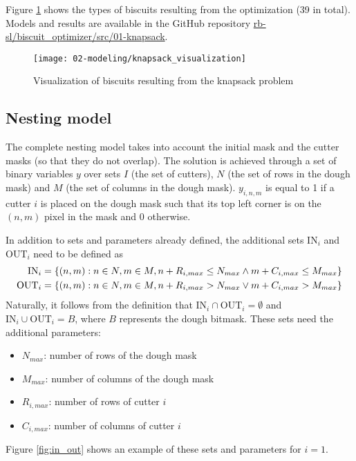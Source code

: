 Figure \ref{fig:knapsack} shows the types of biscuits resulting from the optimization (39 in total). Models and results are available in the GitHub repository \href{https://github.com/rb-sl/biscuit_optimizer/tree/main/src/01-knapsack}{rb-sl/biscuit\_optimizer/src/01-knapsack}.

\begin{figure}[H]
	\centering	
	\texttt{[image: 02-modeling/knapsack\_visualization]}
	\caption{Visualization of biscuits resulting from the knapsack problem}
	\label{fig:knapsack}
\end{figure}

\subsection{Nesting model}\label{sec:nesting}
The complete nesting model takes into account the initial mask and the cutter masks (so that they do not overlap). The solution is achieved through a set of binary variables $y$ over sets $I$ (the set of cutters), $N$ (the set of rows in the dough mask) and $M$ (the set of columns in the dough mask). $y_{i, n, m}$ is equal to 1 if a cutter $i$ is placed on the dough mask such that its top left corner is on the $(n, m)$ pixel in the mask and 0 otherwise.

In addition to sets and parameters already defined, the additional sets $\textrm{IN}_i$ and $\textrm{OUT}_i$ need to be defined as
\begin{alignat}{1}
	\textrm{IN}_i	& = \{(n, m): n \in N, m \in M, n + R_{i,max} \leq N_{max} \wedge m + C_{i,max} \leq M_{max} \} \notag \\
	\textrm{OUT}_i 	& = \{(n, m): n \in N, m \in M, n + R_{i,max} > N_{max} \vee m + C_{i,max} > M_{max} \} \notag
\end{alignat}
Naturally, it follows from the definition that $\textrm{IN}_i \cap \textrm{OUT}_i = \emptyset$ and $\textrm{IN}_i \cup \textrm{OUT}_i = B$, where $B$ represents the dough bitmask.
These sets need the additional parameters:
\begin{itemize}[itemsep=-1mm, topsep=0mm]
	\item $N_{max}$: number of rows of the dough mask
	\item $M_{max}$: number of columns of the dough mask
	\item $R_{i,max}$: number of rows of cutter $i$
	\item $C_{i,max}$: number of columns of cutter $i$
\end{itemize}
Figure \ref{fig:in_out} shows an example of these sets and parameters for $i=1$.

